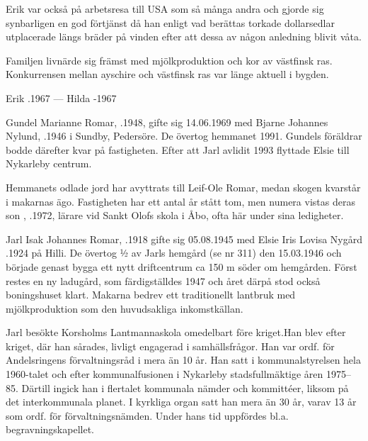 Erik var också på arbetsresa till USA som så många andra och gjorde sig synbarligen en god förtjänst då han enligt vad berättas torkade
dollarsedlar utplacerade längs bräder på vinden efter att dessa av någon anledning blivit våta.

Familjen livnärde sig främst med mjölkproduktion och kor av västfinsk ras. Konkurrensen mellan ayschire och västfinsk ras var länge aktuell i bygden.

Erik .1967  ---  Hilda -1967






Gundel Marianne Romar, .1948, gifte sig 14.06.1969 med Bjarne Johannes Nylund, .1946 i Sundby, Pedersöre. De övertog hemmanet 1991. Gundels föräldrar bodde därefter kvar på fastigheten. Efter att Jarl avlidit 1993 flyttade Elsie till Nykarleby centrum.

Hemmanets odlade jord har avyttrats till Leif-Ole Romar, medan skogen kvarstår i makarnas ägo. Fastigheten har ett antal år stått tom, men numera vistas deras son , .1972, lärare vid Sankt Olofs skola i  Åbo, ofta här under sina ledigheter.


Jarl Isak Johannes Romar, .1918 gifte sig 05.08.1945 med Elsie Iris Lovisa Nygård .1924 på Hilli. De övertog ½ av Jarls hemgård (se nr 311) den 15.03.1946 och började genast bygga ett nytt driftcentrum ca 150 m söder om hemgården. Först restes en ny ladugård, som färdigställdes 1947 och året därpå stod också boningshuset klart. Makarna bedrev ett traditionellt lantbruk med mjölkproduktion som den huvudsakliga inkomstkällan.

Jarl besökte Korsholms Lantmannaskola omedelbart före kriget.Han blev efter kriget, där han sårades, livligt engagerad i samhällsfrågor. Han var ordf. för Andelsringens förvaltningsråd i mera än 10 år. Han satt i kommunalstyrelsen hela 1960-talet och efter kommunalfusionen i Nykarleby stadsfullmäktige åren 1975--85. Därtill ingick han i flertalet kommunala nämder och kommittéer, liksom på det interkommunala planet. I kyrkliga organ satt han mera än 30 år, varav 13 år som ordf. för förvaltningsnämden. Under hans tid uppfördes bl.a. begravningskapellet.

